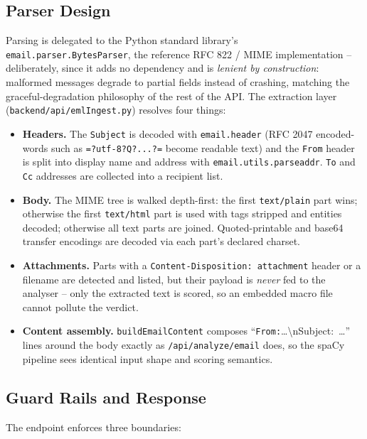 \subsection{Parser Design}

Parsing is delegated to the Python standard library's
\texttt{email.parser.BytesParser}, the reference RFC 822 / MIME
implementation -- deliberately, since it adds no dependency and is
\emph{lenient by construction}: malformed messages degrade to partial
fields instead of crashing, matching the graceful-degradation
philosophy of the rest of the API.  The extraction layer
(\texttt{backend/api/emlIngest.py}) resolves four things:

\begin{itemize}
\item
  \textbf{Headers.}  The \texttt{Subject} is decoded with
  \texttt{email.header} (RFC 2047 encoded-words such as
  \texttt{=?utf-8?Q?...?=} become readable text) and the
  \texttt{From} header is split into display name and address with
  \texttt{email.utils.parseaddr}.  \texttt{To} and \texttt{Cc}
  addresses are collected into a recipient list.
\item
  \textbf{Body.}  The MIME tree is walked depth-first: the first
  \texttt{text/plain} part wins; otherwise the first \texttt{text/html}
  part is used with tags stripped and entities decoded; otherwise all
  text parts are joined.  Quoted-printable and base64 transfer
  encodings are decoded via each part's declared charset.
\item
  \textbf{Attachments.}  Parts with a \texttt{Content-Disposition:
  attachment} header or a filename are detected and listed, but their
  payload is \emph{never} fed to the analyser -- only the extracted
  text is scored, so an embedded macro file cannot pollute the
  verdict.
\item
  \textbf{Content assembly.}  \texttt{buildEmailContent} composes
  ``\texttt{From:}\ldots\textbackslash nSubject:\ \ldots'' lines
  around the body exactly as \texttt{/api/analyze/email} does, so the
  spaCy pipeline sees identical input shape and scoring semantics.
\end{itemize}

\subsection{Guard Rails and Response}

The endpoint enforces three boundaries:

